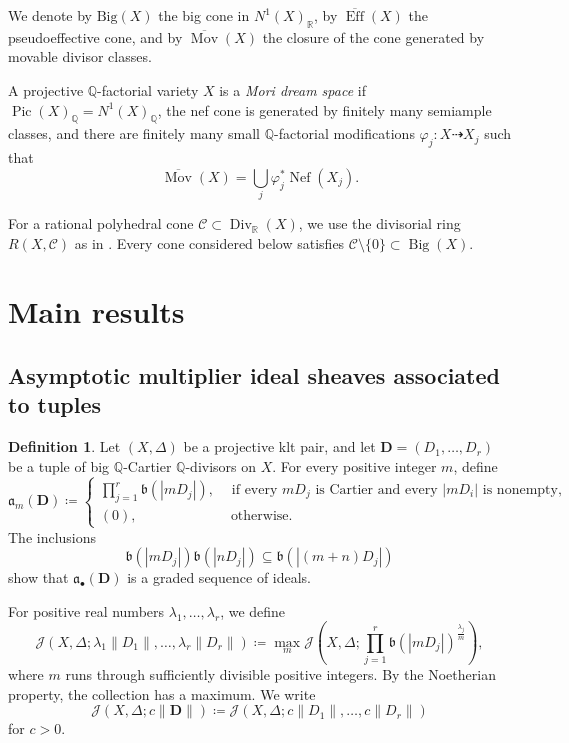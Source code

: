 \documentclass[a4paper,12pt]{amsart}
\theoremstyle{plain}
\theoremstyle{definition}
\newtheorem{definition}[theorem]{Definition}
\numberwithin{equation}{section}
\newcommand{\R}{\mathbb{R}}
\newcommand{\Q}{\mathbb{Q}}
\DeclareMathOperator{\Nef}{Nef}
\DeclareMathOperator{\Eff}{Eff}
\DeclareMathOperator{\Bigdiv}{Big}
\DeclareMathOperator{\Div}{Div}
\def\Pic{\operatorname{Pic}}
\def\Mov{\operatorname{Mov}}
\begin{document}
We denote by $\mathrm{Big}(X)$ the big cone in $N^1(X)_{\R}$, by $\overline{\Eff}(X)$ the pseudoeffective cone, and by $\overline{\Mov}(X)$ the closure of the cone generated by movable divisor classes.

A projective $\Q$-factorial variety $X$ is a \emph{Mori dream space} if $\Pic(X)_{\Q}=N^1(X)_{\Q}$, the nef cone is generated by finitely many semiample classes, and there are finitely many small $\Q$-factorial modifications $\varphi_j\colon X\dashrightarrow X_j$ such that
\[
\overline{\Mov}(X)=\bigcup_j \varphi_j^{\ast}\Nef(X_j).
\]

For a rational polyhedral cone $\mathcal C\subset\Div_{\R}(X)$, we use the divisorial ring $R(X,\mathcal C)$ as in \cite[Section 3]{KKL}. Every cone considered below satisfies $\mathcal C\setminus\{0\}\subset\Bigdiv(X)$.

\section{Main results}\label{sect-3}
\subsection{Asymptotic multiplier ideal sheaves associated to tuples}
\begin{definition}
Let $(X,\Delta)$ be a projective klt pair, and let $\mathbf D=(D_1,\ldots,D_r)$ be a tuple of big $\mathbb Q$-Cartier $\mathbb Q$-divisors on $X$. For every positive integer $m$, define
\[
\mathfrak a_m(\mathbf D)
\coloneqq
\begin{cases}
\displaystyle
\prod_{j=1}^r \mathfrak b(|mD_j|),
&
\begin{array}{l}
\text{if every $mD_j$ is Cartier and every \(|mD_i|\) is nonempty},
\end{array}
\\[4mm]
(0),& \text{ otherwise.}
\end{cases}
\]
The inclusions
\[
\mathfrak b(|mD_j|)\mathfrak b(|nD_j|)
\subseteq
\mathfrak b(|(m+n)D_j|)
\]
show that $\mathfrak a_\bullet(\mathbf D)$ is a graded sequence of ideals.

For positive real numbers \(\lambda_1,\dots,\lambda_r\),
we define
\[
\mathcal J(X,\Delta;\lambda_1\|D_1\|,\dots,\lambda_r\|D_r\|)\coloneqq\max_{m}
\mathcal J\left(X,\Delta;\prod_{j=1}^r \mathfrak b(|mD_j|)^{\frac{\lambda_j}{m}}\right),
\]
where \(m\) runs through sufficiently divisible positive integers. By the Noetherian property, the collection has a maximum. We write
\[
\mathcal J(X,\Delta;c\|\mathbf{D}\|)\coloneqq \mathcal J\left(X,\Delta;c\|D_1\|,\dots,c\|D_r\|\right)
\]
for $c>0$.
\end{definition}
\end{document}
